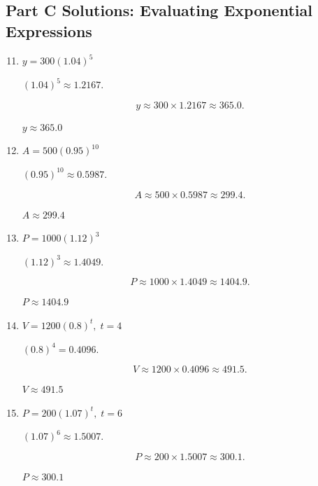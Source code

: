 \documentclass[14pt]{extarticle}
\begin{document}
\subsection*{Part C Solutions: Evaluating Exponential Expressions}
\begin{enumerate}
  \setcounter{enumi}{10}
  \item \(y = 300(1.04)^5\)

  \((1.04)^5 \approx 1.2167.\)

  \[
  y \approx 300 \times 1.2167 \approx 365.0.
  \]

  \(\boxed{y \approx 365.0}\)

  \item \(A = 500(0.95)^{10}\)

  \((0.95)^{10} \approx 0.5987.\)

  \[
  A \approx 500 \times 0.5987 \approx 299.4.
  \]

  \(\boxed{A \approx 299.4}\)

  \item \(P = 1000(1.12)^3\)

  \((1.12)^3 \approx 1.4049.\)

  \[
  P \approx 1000 \times 1.4049 \approx 1404.9.
  \]

  \(\boxed{P \approx 1404.9}\)

  \item \(V = 1200(0.8)^t,\; t=4\)

  \((0.8)^4 = 0.4096.\)

  \[
  V \approx 1200 \times 0.4096 \approx 491.5.
  \]

  \(\boxed{V \approx 491.5}\)

  \item \(P = 200(1.07)^t,\; t=6\)

  \((1.07)^6 \approx 1.5007.\)

  \[
  P \approx 200 \times 1.5007 \approx 300.1.
  \]

  \(\boxed{P \approx 300.1}\)
\end{enumerate}
\end{document}
